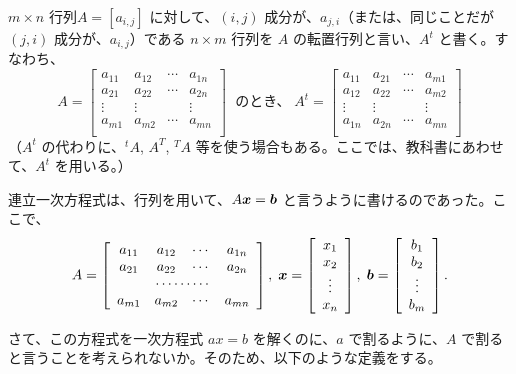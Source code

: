 \begin{definition}
$m\times n$  行列$A = [a_{i,j}]$ に対して、$(i,j)$ 成分が、$a_{j,i}$（または、同じことだが $(j,i)$ 成分が、$a_{i,j}$）である $n\times m$ 行列を $A$ の転置行列と言い、$A^t$ と書く。すなわち、
$$A = \left[\begin{array}{cccc}
a_{11} & a_{12} & \cdots & a_{1n} \\
a_{21} & a_{22} & \cdots & a_{2n} \\
\vdots & \vdots &            & \vdots \\
a_{m1} & a_{m2} & \cdots & a_{mn}\\
\end{array}
\right]\;\mbox{ のとき、}\;
A^t = \left[\begin{array}{cccc}
a_{11} & a_{21} & \cdots & a_{m1} \\
a_{12} & a_{22} & \cdots & a_{m2} \\
\vdots & \vdots &            & \vdots \\
a_{1n} & a_{2n} & \cdots & a_{mn}\\
\end{array}
\right]$$
（$A^t$ の代わりに、${}^tA$, $A^T$, ${}^TA$ 等を使う場合もある。ここでは、教科書にあわせて、$A^t$ を用いる。）
\end{definition}


\newpage
{}
連立一次方程式は、行列を用いて、$A\mbox{\boldmath $x$} = \mbox{\boldmath $b$}$ と言うように書けるのであった。ここで、
$$A = \left[\begin{array}{cccc}
a_{11} & a_{12} & \cdots & a_{1n}\\
a_{21} & a_{22} & \cdots & a_{2n} \\
\multicolumn{4}{c}{\cdots\cdots\cdots}\\
a_{m1} & a_{m2} & \cdots & a_{mn}
\end{array}
\right],\;\bx = \left[\begin{array}{c}
x_1\\
x_2\\
\vdots\\
x_n
\end{array}
\right],\;\bb = \left[\begin{array}{c}
b_1\\
b_2\\
\vdots\\
b_m
\end{array}
\right].$$

さて、この方程式を一次方程式 $ax = b$ を解くのに、$a$ で割るように、$A$ で割ると言うことを考えられないか。そのため、以下のような定義をする。

